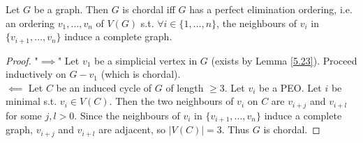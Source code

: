 \begin{theorem}\label{5.24}
    Let $G$ be a graph. Then $G$ is chordal iff $G$ has a perfect elimination ordering, i.e. an ordering $v_1,...,v_n$ of $V(G)$ s.t. $\forall i\in \{1,\dots, n\}$, the neighbours of $v_i$ in $\{v_{i+1},\dots,v_n\}$ induce a complete graph.
\end{theorem}
\begin{proof}
        "$\implies$" Let $v_1$ be a simplicial vertex in $G$ (exists by Lemma \ref{5.23}). Proceed inductively on $G-v_1$ (which is chordal).\\ 
        $\impliedby$ Let $C$ be an induced cycle of $G$ of length $\geq 3$. Let $v_i$ be a PEO. Let $i$ be minimal s.t. $v_i\in V(C)$. Then the two neighbours of $v_i$ on $C$ are $v_{i+j}$ and $v_{i+l}$ for some $j,l>0$. Since the neighbours of $v_i$ in $\{v_{i+1},...,v_n\}$ induce a complete graph, $v_{i+j}$ and $v_{i+l}$ are adjacent, so $|V(C)|=3$. Thus $G$ is chordal.
\end{proof}
